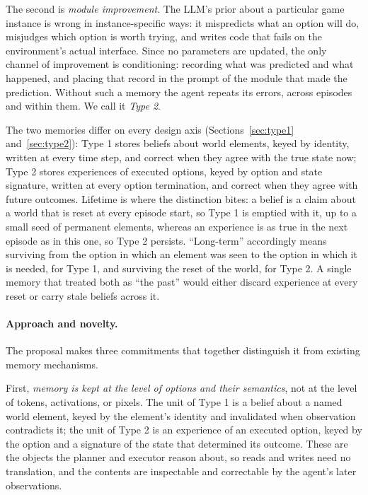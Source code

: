 \documentclass[10pt]{article}
\begin{document}
The second is \emph{module improvement}. The LLM's prior about a particular game instance is wrong in instance-specific ways: it mispredicts what an option will do, misjudges which option is worth trying, and writes code that fails on the environment's actual interface. Since no parameters are updated, the only channel of improvement is conditioning: recording what was predicted and what happened, and placing that record in the prompt of the module that made the prediction. Without such a memory the agent repeats its errors, across episodes and within them. We call it \emph{Type 2}.

The two memories differ on every design axis (Sections~\ref{sec:type1} and~\ref{sec:type2}): Type 1 stores beliefs about world elements, keyed by identity, written at every time step, and correct when they agree with the true state now; Type 2 stores experiences of executed options, keyed by option and state signature, written at every option termination, and correct when they agree with future outcomes. Lifetime is where the distinction bites: a belief is a claim about a world that is reset at every episode start, so Type 1 is emptied with it, up to a small seed of permanent elements, whereas an experience is as true in the next episode as in this one, so Type 2 persists. ``Long-term'' accordingly means surviving from the option in which an element was seen to the option in which it is needed, for Type 1, and surviving the reset of the world, for Type 2. A single memory that treated both as ``the past'' would either discard experience at every reset or carry stale beliefs across it.

\paragraph{Approach and novelty.}
The proposal makes three commitments that together distinguish it from existing memory mechanisms.

First, \emph{memory is kept at the level of options and their semantics}, not at the level of tokens, activations, or pixels. The unit of Type 1 is a belief about a named world element, keyed by the element's identity and invalidated when observation contradicts it; the unit of Type 2 is an experience of an executed option, keyed by the option and a signature of the state that determined its outcome. These are the objects the planner and executor reason about, so reads and writes need no translation, and the contents are inspectable and correctable by the agent's later observations.
\end{document}
